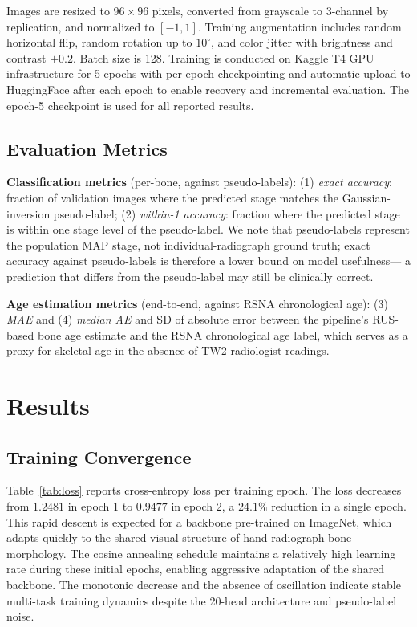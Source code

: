 \documentclass[journal]{IEEEtran}
\begin{document}
Images are resized to $96 \times 96$ pixels, converted from
grayscale to 3-channel by replication, and normalized to $[-1, 1]$.
Training augmentation includes random horizontal flip,
random rotation up to $10^{\circ}$, and color jitter with
brightness and contrast $\pm 0.2$.
Batch size is 128.
Training is conducted on Kaggle T4 GPU infrastructure for
5 epochs with per-epoch checkpointing and automatic upload
to HuggingFace after each epoch to enable recovery and
incremental evaluation.
The epoch-5 checkpoint is used for all reported results.

\subsection{Evaluation Metrics}

\textbf{Classification metrics} (per-bone, against pseudo-labels):
(1) \textit{exact accuracy}: fraction of validation images where
the predicted stage matches the Gaussian-inversion pseudo-label;
(2) \textit{within-1 accuracy}: fraction where the predicted
stage is within one stage level of the pseudo-label.
We note that pseudo-labels represent the population MAP stage,
not individual-radiograph ground truth; exact accuracy against
pseudo-labels is therefore a lower bound on model usefulness—
a prediction that differs from the pseudo-label may still be
clinically correct.

\textbf{Age estimation metrics} (end-to-end, against RSNA
chronological age):
(3) \textit{MAE} and (4) \textit{median AE} and SD of absolute
error between the pipeline's RUS-based bone age estimate and
the RSNA chronological age label, which serves as a proxy
for skeletal age in the absence of TW2 radiologist readings.

\section{Results}
\label{sec:results}

\subsection{Training Convergence}

Table~\ref{tab:loss} reports cross-entropy loss per training epoch.
The loss decreases from $1.2481$ in epoch 1 to $0.9477$ in epoch 2,
a $24.1\%$ reduction in a single epoch.
This rapid descent is expected for a backbone pre-trained on
ImageNet, which adapts quickly to the shared visual structure of
hand radiograph bone morphology.
The cosine annealing schedule maintains a relatively high learning
rate during these initial epochs, enabling aggressive adaptation of
the shared backbone.
The monotonic decrease and the absence of oscillation indicate
stable multi-task training dynamics despite the 20-head architecture
and pseudo-label noise.
\end{document}

